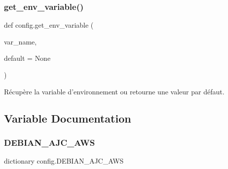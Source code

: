 \subsubsection{\texorpdfstring{get\+\_\+env\+\_\+variable()}{get\_env\_variable()}}
{\footnotesize\ttfamily def config.\+get\+\_\+env\+\_\+variable (\begin{DoxyParamCaption}\item[{}]{var\+\_\+name,  }\item[{}]{default = {\ttfamily None} }\end{DoxyParamCaption})}

\begin{DoxyVerb}Récupère la variable d'environnement ou retourne une valeur par défaut.\end{DoxyVerb}
 

\subsection{Variable Documentation}
\mbox{\label{namespaceconfig_af8dfe12d507571f5fb9183033d873043}} 
\subsubsection{\texorpdfstring{D\+E\+B\+I\+A\+N\+\_\+\+A\+J\+C\+\_\+\+A\+WS}{DEBIAN\_AJC\_AWS}}
{\footnotesize\ttfamily dictionary config.\+D\+E\+B\+I\+A\+N\+\_\+\+A\+J\+C\+\_\+\+A\+WS}

